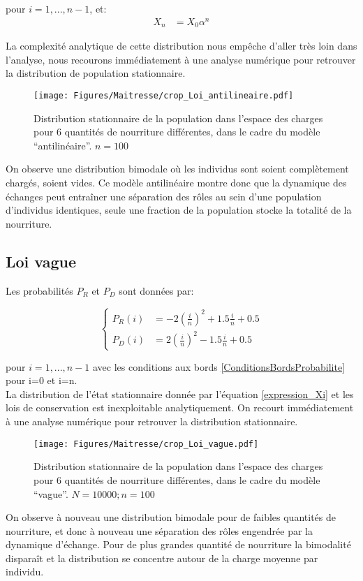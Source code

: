 pour $i=1,...,n-1$, et:
\begin{equation}
\begin{aligned}
X_n&=X_0 \alpha^n
\end{aligned}
\end{equation}

La complexité analytique de cette distribution nous empêche d'aller très loin dans l'analyse, nous recourons immédiatement à une analyse numérique pour retrouver la distribution de population stationnaire.


\begin{figure}[h]
\centering
\texttt{[image: Figures/Maitresse/crop\_Loi\_antilineaire.pdf]}
\caption{Distribution stationnaire de la population dans l'espace des charges pour 6 quantités de nourriture différentes, dans le cadre du modèle ``antilinéaire''. $n=100$}
\label{DistribAnalytiqueAnti}
\end{figure}

On observe une distribution bimodale où les individus sont soient complètement chargés, soient vides. Ce modèle antilinéaire montre donc que la dynamique des échanges peut entraîner une séparation des rôles au sein d'une population d'individus identiques, seule une fraction de la population stocke la totalité de la nourriture.


\subsection{Loi vague}
Les probabilités $P_R$ et $P_D$ sont données par:

\begin{equation}
\left \{
\begin{aligned}
P_R(i) &= -2(\frac{i}{n})^2+1.5\frac{i}{n}+0.5\\
P_D(i) &= 2(\frac{i}{n})^2-1.5\frac{i}{n}+0.5
\end{aligned}
\right.
\end{equation}

pour $i=1,...,n-1$ avec les conditions aux bords \ref{ConditionsBordsProbabilite} pour i=0 et i=n.\\

La distribution de l'état stationnaire donnée par l'équation \ref{expression_Xi} et les lois de conservation est inexploitable analytiquement. On recourt immédiatement à une analyse numérique pour retrouver la distribution stationnaire.


\begin{figure}[h]
\centering
\texttt{[image: Figures/Maitresse/crop\_Loi\_vague.pdf]}
\caption{Distribution stationnaire de la population dans l'espace des charges pour 6 quantités de nourriture différentes, dans le cadre du modèle ``vague''. $N=10000; n=100$}
\label{DistribAnalytiqueVague}
\end{figure}

On observe à nouveau une distribution bimodale pour de faibles quantités de nourriture, et donc à nouveau une séparation des rôles engendrée par la dynamique d'échange. Pour de plus grandes quantité de nourriture la bimodalité disparaît et la distribution se concentre autour de la charge moyenne par individu.